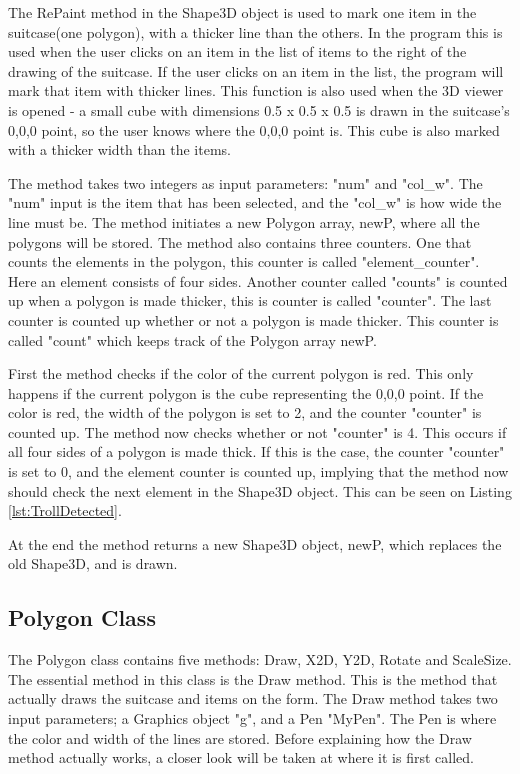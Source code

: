 The RePaint method in the Shape3D object is used to mark one item in the suitcase(one polygon), with a thicker line than the others. In the program this is used when the user clicks on an item in the list of items to the right of the drawing of the suitcase. If the user clicks on an item in the list, the program will mark that item with thicker lines. This function is also used when the 3D viewer is opened - a small cube with dimensions 0.5 x 0.5 x 0.5 is drawn in the suitcase's 0,0,0 point, so the user knows where the 0,0,0 point is. This cube is also marked with a thicker width than the items.

The method takes two integers as input parameters: "num" and "col\_w". The "num" input is the item that has been selected, and the "col\_w" is how wide the line must be. The method initiates a new Polygon array, newP, where all the polygons will be stored. The method also contains three counters. One that counts the elements in the polygon, this counter is called "element\_counter". Here an element consists of four sides. Another counter called "counts" is counted up when a polygon is made thicker, this is counter is called "counter". The last counter is counted up whether or not a polygon is made thicker. This counter is called "count" which keeps track of the Polygon array newP.

First the method checks if the color of the current polygon is red. This only happens if the current polygon is the cube representing the 0,0,0 point. If the color is red, the width of the polygon is set to 2, and the counter "counter" is counted up. The method now checks whether or not "counter" is 4. This occurs if all four sides of a polygon is made thick. If this is the case, the counter "counter" is set to 0, and the element counter is counted up, implying that the method now should check the next element in the Shape3D object. This can be seen on Listing \ref{lst:TrollDetected}.


At the end the method returns a new Shape3D object, newP, which replaces the old Shape3D, and is drawn.

\subsection{Polygon Class} 
\label{sec:polygon}
The Polygon class contains five methods: Draw, X2D, Y2D, Rotate and ScaleSize. The essential method in this class is the Draw method. This is the method that actually draws the suitcase and items on the form. The Draw method takes two input parameters; a Graphics object "g", and a Pen "MyPen". The Pen is where the color and width of the lines are stored. Before explaining how the Draw method actually works, a closer look will be taken at where it is first called.

